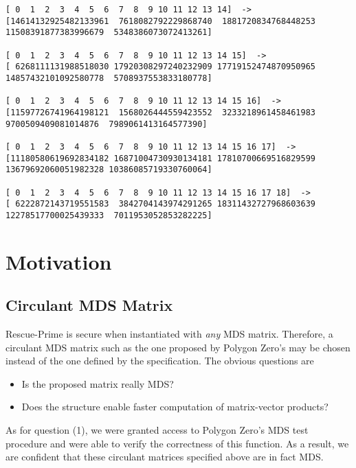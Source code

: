 \documentclass[a4paper]{article}
\begin{document}
\begin{lstlisting}
[ 0  1  2  3  4  5  6  7  8  9 10 11 12 13 14]  -> 
[14614132925482133961  7618082792229868740  1881720834768448253 11508391877383996679  5348386073072413261]

[ 0  1  2  3  4  5  6  7  8  9 10 11 12 13 14 15]  -> 
[ 6268111131988518030 17920308297240232909 17719152474870950965 14857432101092580778  5708937553833180778]

[ 0  1  2  3  4  5  6  7  8  9 10 11 12 13 14 15 16]  -> 
[11597726741964198121  1568026444559423552  3233218961458461983  9700509409081014876  7989061413164577390]

[ 0  1  2  3  4  5  6  7  8  9 10 11 12 13 14 15 16 17]  -> 
[11180580619692834182 16871004730930134181 17810700669516829599 13679692060051982328 10386085719330760064]

[ 0  1  2  3  4  5  6  7  8  9 10 11 12 13 14 15 16 17 18]  -> 
[ 6222872143719551583  3842704143974291265 18311432727968603639 12278517700025439333  7011953052853282225]
\end{lstlisting}

\section{Motivation}

\subsection{Circulant MDS Matrix}

Rescue-Prime is secure when instantiated with \emph{any} MDS matrix. Therefore, a circulant MDS matrix such as the one proposed by Polygon Zero's may be chosen instead of the one defined by the specification. The obvious questions are
\begin{itemize}
\item[1)] Is the proposed matrix really MDS?
\item[2)] Does the structure enable faster computation of matrix-vector products?
\end{itemize}

As for question (1), we were granted access to Polygon Zero's MDS test procedure and were able to verify the correctness of this function. As a result, we are confident that these circulant matrices specified above are in fact MDS. 
\end{document}
